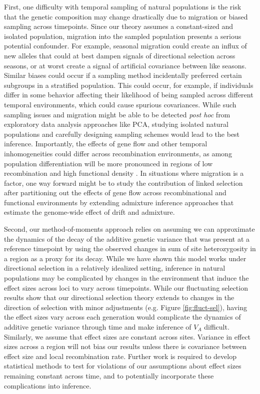 \documentclass[11pt]{article}
\begin{document}
First, one difficulty with temporal sampling of natural populations is the risk
that the genetic composition may change drastically due to migration or biased
sampling across timepoints. Since our theory assumes a constant-sized and
isolated population, migration into the sampled population presents a serious
potential confounder. For example, seasonal migration could create an influx of
new alleles that could at best dampen signals of directional selection across
seasons, or at worst create a signal of artificial covariance between like
seasons. Similar biases could occur if a sampling method incidentally preferred
certain subgroups in a stratified population. This could occur, for example, if
individuals differ in some behavior affecting their likelihood of being sampled
across different temporal environments, which could cause spurious covariances.
While such sampling issues and migration might be able to be detected
\emph{post hoc} from exploratory data analysis approaches like PCA, studying
isolated natural populations and carefully designing sampling schemes would
lead to the best inference. Importantly, the effects of gene flow and other
temporal inhomogeneities could differ across recombination environments, as
among population differentiation will be more pronounced in regions of low
recombination and high functional density
\parencite{Keinan2010-ry,Burri2017-ml,Nachman2012-sw}. In situations where
  migration is a factor, one way forward might be to study the contribution of
  linked selection after partitioning out the effects of gene flow across
  recombinational and functional environments by extending admixture inference
approaches that estimate the genome-wide effect of drift and admixture.

Second, our method-of-moments approach relies on assuming we can approximate
the dynamics of the decay of the additive genetic variance that was present at
a reference timepoint by using the observed changes in sum of site
heterozygosity in a region as a proxy for its decay. While we have shown this
model works under directional selection in a relatively idealized setting,
inference in natural populations may be complicated by changes in the
environment that induce the effect sizes across loci to vary across timepoints.
While our fluctuating selection results show that our directional selection
theory extends to changes in the direction of selection with minor adjustments
(e.g. Figure \ref{fig:fluct-sel}), having the effect sizes vary across each
generation would complicate the dynamics of additive genetic variance through
time and make inference of $V_A$ difficult.  Similarly, we assume that effect
sizes are constant across sites. Variance in effect sizes across a region will
not bias our results unless there is covariance between effect size and local
recombination rate. Further work is required to develop statistical methods to
test for violations of our assumptions about effect sizes remaining constant
across time, and to potentially incorporate these complications into inference.
\end{document}
